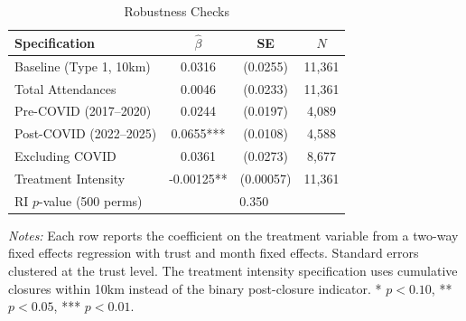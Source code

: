 \begin{table}[htbp]
\centering
\caption{Robustness Checks}
\label{tab:robust}
\begin{tabular}{lccc}
\hline\hline
Specification & $\hat{\beta}$ & SE & $N$ \\
\hline
Baseline (Type 1, 10km) & 0.0316 & (0.0255) & 11,361 \\
Total Attendances & 0.0046 & (0.0233) & 11,361 \\
Pre-COVID (2017--2020) & 0.0244 & (0.0197) & 4,089 \\
Post-COVID (2022--2025) & 0.0655*** & (0.0108) & 4,588 \\
Excluding COVID & 0.0361 & (0.0273) & 8,677 \\
Treatment Intensity & -0.00125** & (0.00057) & 11,361 \\
RI $p$-value (500 perms) & \multicolumn{3}{c}{0.350} \\
\hline\hline
\end{tabular}
\begin{tablenotes}[flushleft]
\small
\item \textit{Notes:} Each row reports the coefficient on the treatment variable from a two-way fixed effects regression with trust and month fixed effects. Standard errors clustered at the trust level. The treatment intensity specification uses cumulative closures within 10km instead of the binary post-closure indicator. * $p < 0.10$, ** $p < 0.05$, *** $p < 0.01$.
\end{tablenotes}
\end{table}
